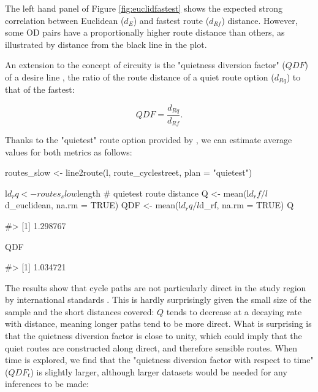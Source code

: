 The left hand panel of Figure \ref{fig:euclidfastest} shows the expected
strong correlation between Euclidean (\(d_E\)) and fastest route
(\(d_{Rf}\)) distance. However, some OD pairs have a proportionally
higher route distance than others, as illustrated by distance from the
black line in the plot.

An extension to the concept of circuity is the "quietness diversion
factor" ($QDF$) of a desire line \citep{lovelace_propensity_2017}, the
ratio of the route distance of a quiet route option ($d_{Rq}$) to that
of the fastest:

\[
 QDF = \frac{d_{Rq}}{d_{Rf}}.
\]

Thanks to the "quietest" route option provided by
, we can estimate average values for both
metrics as follows:

\begin{Schunk}
\begin{Sinput}
routes_slow <- line2route(l, route_cyclestreet, plan = "quietest")
\end{Sinput}
\end{Schunk}

\begin{Schunk}
\begin{Sinput}
l$d_rq <- routes_slow$length # quietest route distance
Q <- mean(l$d_rf / l$d_euclidean, na.rm = TRUE)
QDF <- mean(l$d_rq / l$d_rf, na.rm = TRUE)
Q
\end{Sinput}
\begin{Soutput}
#> [1] 1.298767
\end{Soutput}
\begin{Sinput}
QDF
\end{Sinput}
\begin{Soutput}
#> [1] 1.034721
\end{Soutput}
\end{Schunk}

The results show that cycle paths are not particularly direct in the
study region by international standards \citep{crow_design_2007}. This
is hardly surprisingly given the small size of the sample and the short
distances covered: $Q$ tends to decrease at a decaying rate with
distance, meaning longer paths tend to be more direct.
What is surprising is that the quietness diversion factor
is close to unity, which
could imply that the quiet routes are constructed along direct, and
therefore sensible routes.
When time is
explored, we find that the "quietness diversion factor with respect to
time" (\(QDF_t\)) is slightly larger,
although larger datasets would be needed for any inferences to be made:

